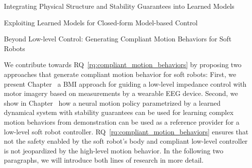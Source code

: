 \begin{contribution}\label{contrib:learned_models}
    Integrating Physical Structure and Stability Guarantees into Learned Models
\end{contribution}

\begin{contribution}\label{contrib:model_based_control_with_learned_models}
    Exploiting Learned Models for Closed-form Model-based Control
\end{contribution}

\begin{contribution}\label{contrib:motion_behaviors}
    Beyond Low-level Control: Generating Compliant Motion Behaviors for Soft Robots
\end{contribution}

We contribute towards \gls{RQ}~\ref{rq:compliant_motion_behaviors} by proposing two approaches that generate compliant motion behavior for soft robots: First, we present Chapter~\circled{\ref{chp:braincontrol}} a \gls{BMI} approach for guiding a low-level impedance control with motor imagery based on measurements by a wearable \gls{EEG} device. Second, we show in Chapter~\circled{\ref{chp:osmp}} how a neural motion policy parametrized by a learned dynamical system with stability guarantees can be used for learning complex motion behaviors from demonstration can be used as a reference provider for a low-level soft robot controller. 
\gls{RQ}~\ref{rq:compliant_motion_behaviors} ensures that not the safety enabled by the soft robot's body and compliant low-level controller is not jeopardized by the high-level motion behavior.
In the following two paragraphs, we will introduce both lines of research in more detail.

